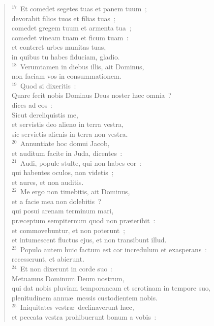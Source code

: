 \begin{flushleft}
\begin{verse}
${}^{17}$~Et comedet segetes tuas et panem tuum~;\\ devorabit filios tuos et filias tuas~;\\ comedet gregem tuum et armenta tua~;\\ comedet vineam tuam et ficum tuam~:\\ et conteret urbes munitas tuas,\\ in quibus tu habes fiduciam, gladio.\\
${}^{18}$~Verumtamen in diebus illis, ait Dominus,\\ non faciam vos in consummationem.\\
${}^{19}$~Quod si dixeritis~:\\ Quare fecit nobis Dominus Deus noster h\ae c omnia~?\\ dices ad eos~:\\ Sicut dereliquistis me,\\ et servistis deo alieno in terra vestra,\\ sic servietis alienis in terra non vestra.\\
${}^{20}$~Annuntiate hoc domui Jacob,\\ et auditum facite in Juda, dicentes~:\\
${}^{21}$~Audi, popule stulte, qui non habes cor~:\\ qui habentes oculos, non videtis~;\\ et aures, et non auditis.\\
${}^{22}$~Me ergo non timebitis, ait Dominus,\\ et a facie mea non dolebitis~?\\ qui posui arenam terminum mari,\\ pr\ae ceptum sempiternum quod non pr\ae teribit~:\\ et commovebuntur, et non poterunt~;\\ et intumescent fluctus ejus, et non transibunt illud.\\
${}^{23}$~Populo autem huic factum est cor incredulum et exasperans~:\\ recesserunt, et abierunt.\\
${}^{24}$~Et non dixerunt in corde suo~:\\ Metuamus Dominum Deum nostrum,\\ qui dat nobis pluviam temporaneam et serotinam in tempore suo,\\ plenitudinem annu\ae\ messis custodientem nobis.\\
${}^{25}$~Iniquitates vestr\ae\ declinaverunt h\ae c,\\ et peccata vestra prohibuerunt bonum a vobis~:\\

\end{verse}
\end{flushleft}
